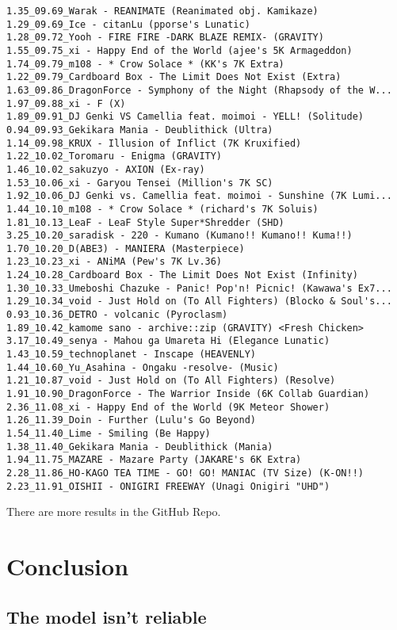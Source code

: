 \begin{lstlisting}
1.35_09.69_Warak - REANIMATE (Reanimated obj. Kamikaze)
1.29_09.69_Ice - citanLu (pporse's Lunatic)
1.28_09.72_Yooh - FIRE FIRE -DARK BLAZE REMIX- (GRAVITY)
1.55_09.75_xi - Happy End of the World (ajee's 5K Armageddon)
1.74_09.79_m108 - * Crow Solace * (KK's 7K Extra)
1.22_09.79_Cardboard Box - The Limit Does Not Exist (Extra)
1.63_09.86_DragonForce - Symphony of the Night (Rhapsody of the W...
1.97_09.88_xi - F (X)
1.89_09.91_DJ Genki VS Camellia feat. moimoi - YELL! (Solitude)
0.94_09.93_Gekikara Mania - Deublithick (Ultra)
1.14_09.98_KRUX - Illusion of Inflict (7K Kruxified)
1.22_10.02_Toromaru - Enigma (GRAVITY)
1.46_10.02_sakuzyo - AXION (Ex-ray)
1.53_10.06_xi - Garyou Tensei (Million's 7K SC)
1.92_10.06_DJ Genki vs. Camellia feat. moimoi - Sunshine (7K Lumi...
1.44_10.10_m108 - * Crow Solace * (richard's 7K Soluis)
1.81_10.13_LeaF - LeaF Style Super*Shredder (SHD)
3.25_10.20_saradisk - 220 - Kumano (Kumano!! Kumano!! Kuma!!)
1.70_10.20_D(ABE3) - MANIERA (Masterpiece)
1.23_10.23_xi - ANiMA (Pew's 7K Lv.36)
1.24_10.28_Cardboard Box - The Limit Does Not Exist (Infinity)
1.30_10.33_Umeboshi Chazuke - Panic! Pop'n! Picnic! (Kawawa's Ex7...
1.29_10.34_void - Just Hold on (To All Fighters) (Blocko & Soul's...
0.93_10.36_DETRO - volcanic (Pyroclasm)
1.89_10.42_kamome sano - archive::zip (GRAVITY) <Fresh Chicken>
3.17_10.49_senya - Mahou ga Umareta Hi (Elegance Lunatic)
1.43_10.59_technoplanet - Inscape (HEAVENLY)
1.44_10.60_Yu_Asahina - Ongaku -resolve- (Music)
1.21_10.87_void - Just Hold on (To All Fighters) (Resolve)
1.91_10.90_DragonForce - The Warrior Inside (6K Collab Guardian)
2.36_11.08_xi - Happy End of the World (9K Meteor Shower)
1.26_11.39_Doin - Further (Lulu's Go Beyond)
1.54_11.40_Lime - Smiling (Be Happy)
1.38_11.40_Gekikara Mania - Deublithick (Mania)
1.94_11.75_MAZARE - Mazare Party (JAKARE's 6K Extra)
2.28_11.86_HO-KAGO TEA TIME - GO! GO! MANIAC (TV Size) (K-ON!!)
2.23_11.91_OISHII - ONIGIRI FREEWAY (Unagi Onigiri "UHD")

\end{lstlisting}

There are more results in the GitHub Repo.

\section{Conclusion}

\subsection{The model isn't reliable}

